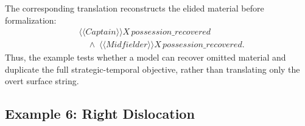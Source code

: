 \documentclass[letterpaper]{article}
\newcommand{\atl}[1]{\ensuremath{\langle\!\langle #1 \rangle\!\rangle}}
\begin{document}

The corresponding translation reconstructs the elided material before formalization:
\[
\begin{aligned}
&\atl{Captain}X\,possession\_recovered \\
&\quad \wedge\; \atl{Midfielder}X\,possession\_recovered.
\end{aligned}
\]
Thus, the example tests whether a model can recover omitted material and duplicate the full strategic-temporal objective, rather than translating only the overt surface string.

\subsection{Example 6: Right Dislocation}
 
\end{document}
